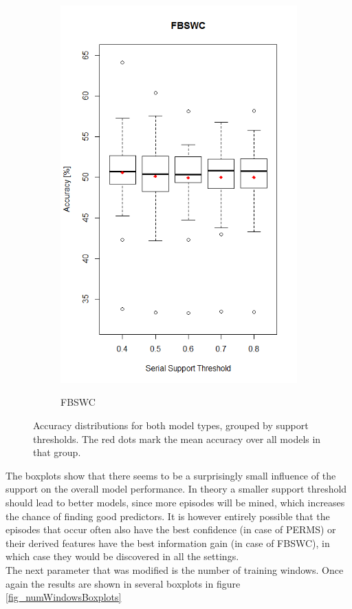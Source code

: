 \begin{figure}[h]
\begin{subfigure}{.5\textwidth}
  \includegraphics[width=\linewidth]{fbswcSupportSerial}
  \label{fig_fbswcSupportSerial}
  \caption{FBSWC}
\end{subfigure}
\caption[Accuracy Trend depending on Support]{Accuracy distributions for both model types, grouped by support thresholds. The red dots mark the mean accuracy over all models in that group.}
\label{fig_supportBoxplots}
\end{figure}

The boxplots show that there seems to be a surprisingly small influence of the support on the overall model performance. In theory a smaller support threshold should lead to better models, since more episodes will be mined, which increases the chance of finding good predictors. It is however entirely possible that the episodes that occur often also have the best confidence (in case of PERMS) or their derived features have the best information gain (in case of FBSWC), in which case they would be discovered in all the settings. \\
The next parameter that was modified is the number of training windows. Once again the results are shown in several boxplots in figure \ref{fig_numWindowsBoxplots}

